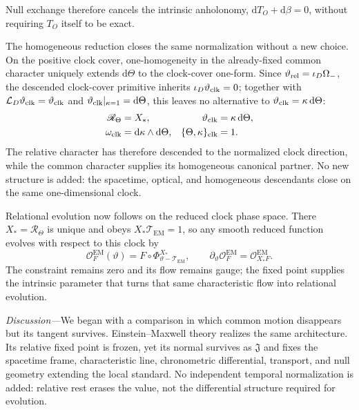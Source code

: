 \documentclass[aps,prl,reprint]{revtex4-2}
\newcommand{\EM}{\mathrm{EM}}
\newcommand{\dd}{\mathrm d}
\newcommand{\Lie}{\mathcal L}
\begin{document}
Null exchange therefore cancels the intrinsic anholonomy, $\dd T_O+\dd\beta=0$, without requiring $T_O$ itself to be exact.

The homogeneous reduction closes the same normalization without a new choice. On the positive clock cover, one-homogeneity in the already-fixed common character uniquely extends $\dd\Theta$ to the clock-cover one-form. Since $\vartheta_{\rm rel}=\iota_D\Omega_-$, the descended clock-cover primitive inherits $\iota_D\vartheta_{\rm clk}=0$; together with $\Lie_D\vartheta_{\rm clk}=\vartheta_{\rm clk}$ and $\vartheta_{\rm clk}|_{\kappa=1}=\dd\Theta$, this leaves no alternative to $\vartheta_{\rm clk}=\kappa\,\dd\Theta$:
\begin{equation}
\begin{aligned}
\mathscr R_\Theta&=X_*,
&\vartheta_{\rm clk}&=\kappa\,\dd\Theta,\\
\omega_{\rm clk}&=\dd\kappa\wedge\dd\Theta,
&\{\Theta,\kappa\}_{\rm clk}&=1 .
\end{aligned}
\label{eq:clockcover}
\end{equation}
The relative character has therefore descended to the normalized clock direction, while the common character supplies its homogeneous canonical partner. No new structure is added: the spacetime, optical, and homogeneous descendants close on the same one-dimensional clock.

Relational evolution now follows on the reduced clock phase space. There $X_*=\mathscr R_\Theta$ is unique and obeys $X_*\mathcal T_{\EM}=1$, so any smooth reduced function evolves with respect to this clock by
\begin{equation}
\mathcal O_F^{\EM}(\vartheta)
=F\circ\Phi^{X_*}_{\vartheta-\mathcal T_{\EM}},
\qquad
\partial_\vartheta\mathcal O_F^{\EM}
=\mathcal O_{X_*F}^{\EM}.
\label{eq:relevolution}
\end{equation}
The constraint remains zero and its flow remains gauge; the fixed point supplies the intrinsic parameter that turns that same characteristic flow into relational evolution.

\textit{Discussion---}We began with a comparison in which common motion disappears but its tangent survives. Einstein--Maxwell theory realizes the same architecture. Its relative fixed point is frozen, yet its normal survives as $\mathfrak J$ and fixes the spacetime frame, characteristic line, chronometric differential, transport, and null geometry extending the local standard. No independent temporal normalization is added: relative rest erases the value, not the differential structure required for evolution.
\end{document}
